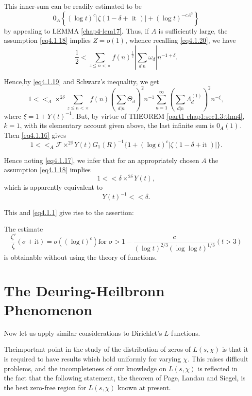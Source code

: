 This inner-sum can be readily estimated to be
$$
0_A \left\{ (\log t)^c | \zeta (1- \delta + \text{ it }) | + (\log t)^{-cA^3}
\right\} 
$$
by appealing to LEMMA \ref{chap4-lem17}. Thus, if $A$ is sufficiently large, the
assumption \eqref{eq4.1.18} implies $Z = o (1)$, whence recalling
\eqref{eq4.1.20}, we have 
$$
\frac{1}{2} < \sum_{z \leq n < \times} f(n)^{\frac{1}{2}} | \sum_{d |
  n} \omega_d | n^{-1+\delta}. 
$$

Hence,\pageoriginale by \eqref{eq4.1.19} and Schwarz's inequality, we get
$$
1 <<_A \times^{2 \delta} \sum_{z \leq n < \times} f(n) \left( \sum_{d | n}
\Theta_d\right)^2 n^{-1} \sum^{\infty}_{n = 1} \left( \sum_{ d | n}
\Lambda_d^{(1)}\right)^2 n^{- \xi}, 
$$
where $\xi = 1 + Y(t)^{-1}$. But, by virtue of THEOREM
\ref{part1-chap1:sec1.3:thm4}, $k = 1$, 
with its elementary account given above, the last infinite sum is $0_A
(1)$. Then \eqref{eq4.1.16} gives 
$$
  1 <<_A \mathscr{F} \times^{2 \delta} Y (t) G_1 (R)^{-1} \{ 1 +
  (\log t)^c | \zeta (1- \delta + \text{it }) | \}. 
$$ 

Hence noting \eqref{eq4.1.17}, we infer that for an appropriately chosen $A$
the assumption \eqref{eq4.1.18} implies 
$$
1 << \delta \times^{2 \delta} Y(t),
$$ 
which is apparently equivalent to 
$$ 
Y(t)^{-1} << \delta.
$$

This and \eqref{eq4.1.1} give rise to the assertion:
\begin{theorem}\label{chap4-thm11}%
The estimate 
$$
\frac{\zeta'}{\zeta} (\sigma + \text{it}) = o((\log t)^c) \text{for }
\sigma > 1 - \frac{c}{(\log t)^{2/3} (\log \log t)^{1/3}} (t > 3) 
$$
is obtainable without using the theory of functions.
\end{theorem}

\section{The Deuring-Heilbronn Phenomenon}\label{chap4-sec4.2}

Now let us apply similar considerations to Dirichlet's $L$-functions.

The\pageoriginale important point in the study of the distribution of
zeros of $L (s, \chi)$ is that it is required to have results which
hold uniformly 
for varying $\chi$. This raises difficult problems, and the
incompleteness of our knowledge on $L(s, \chi)$ is reflected in the
fact that the following statement, the theorem of Page, Landau and
Siegel, is the best zero-free region for $L(s, \chi)$ known at
present. 

